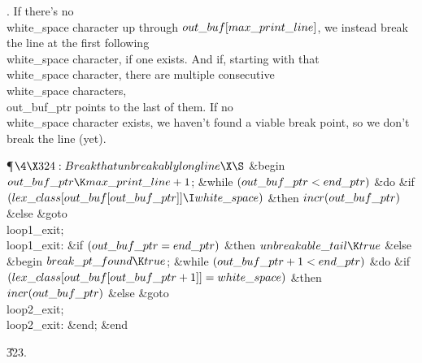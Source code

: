 .
If there's no \\{white\_space} character up through
$\\{out\_buf}[\\{max\_print\_line}]$, we instead break the line at the first
following \\{white\_space} character, if one exists.  And if, starting
with that \\{white\_space} character, there are multiple consecutive
\\{white\_space} characters, \\{out\_buf\_ptr} points to the last of them.
If no \\{white\_space} character exists, we haven't found a viable break
point, so we don't break the line (yet).

\Y\P$\4\X324:Break that unbreakably long line\X\S$\6
\&{begin} $\\{out\_buf\_ptr}\K\\{max\_print\_line}+1$;\6
\&{while} $(\\{out\_buf\_ptr}<\\{end\_ptr})$ \1\&{do}\6
\&{if} $(\\{lex\_class}[\\{out\_buf}[\\{out\_buf\_ptr}]]\I\\{white\_space})$ \1%
\&{then}\5
$\\{incr}(\\{out\_buf\_ptr})$\6
\4\&{else} \&{goto} \\{loop1\_exit};\2\2\6
\4\\{loop1\_exit}: \&{if} $(\\{out\_buf\_ptr}=\\{end\_ptr})$ \1\&{then}\5
$\\{unbreakable\_tail}\K\\{true}$\6
\4\&{else} \2\6
\&{begin} $\\{break\_pt\_found}\K\\{true}$;\6
\&{while} $(\\{out\_buf\_ptr}+1<\\{end\_ptr})$ \1\&{do}\6
\&{if} $(\\{lex\_class}[\\{out\_buf}[\\{out\_buf\_ptr}+1]]=\\{white\_space})$ %
\1\&{then}\5
$\\{incr}(\\{out\_buf\_ptr})$\6
\4\&{else} \&{goto} \\{loop2\_exit};\2\2\6
\4\\{loop2\_exit}: \&{end};\6
\&{end}\par
\U323.\fi

